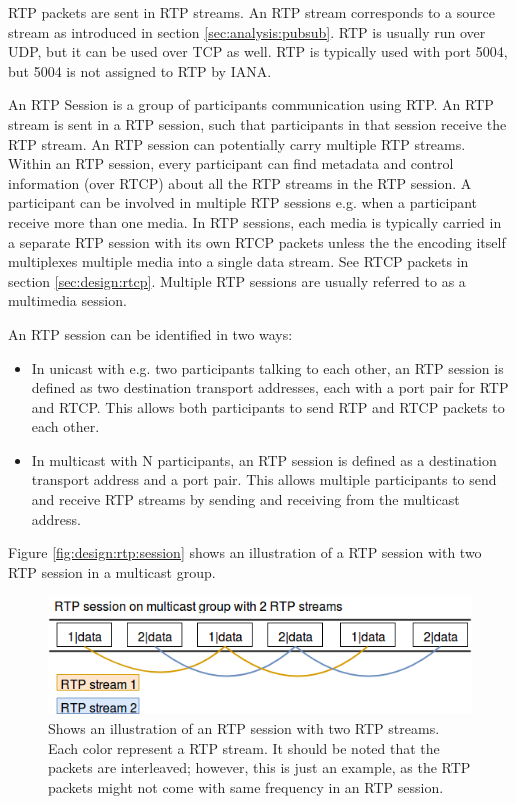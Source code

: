  \label{sec:design:rtpstream}
RTP packets are sent in RTP streams. An RTP stream corresponds to a source stream as introduced in section \ref{sec:analysis:pubsub}. RTP is usually run over UDP, but it can be used over TCP as well. RTP is typically used with port 5004, but 5004 is not assigned to RTP by IANA\citep{iana_ports}.


 \label{sec:design:rtpsession}
An RTP Session is a group of participants communication using RTP.
An RTP stream is sent in a RTP session, such that participants in that session receive the RTP stream. An RTP session can potentially carry multiple RTP streams. Within an RTP session, every participant can find metadata and control information (over RTCP) about all the RTP streams in the RTP session. A participant can be involved in multiple RTP sessions e.g. when a participant receive more than one media. In RTP sessions, each media is typically carried in a separate RTP session with its own RTCP packets unless the the encoding itself multiplexes multiple media into a single data stream. See RTCP packets in section \ref{sec:design:rtcp}. Multiple RTP sessions are usually referred to as a multimedia session.


An RTP session can be identified in two ways:
\begin{itemize}
	\item In unicast with e.g. two participants talking to each other, an RTP session is defined as two destination transport addresses, each with a port pair for RTP and RTCP. This allows both participants to send RTP and RTCP packets to each other.
	\item In multicast with N participants, an RTP session is defined as a destination transport address and a port pair. This allows multiple participants to send and receive RTP streams by sending and receiving from the multicast address.
\end{itemize}


Figure  \ref{fig:design:rtp:session} shows an illustration of a RTP session with two RTP session in a multicast group.
\begin{figure}[H]
	\centering
	\includegraphics[width=\textwidth]{figures/rtp-session}
	\caption{Shows an illustration of an RTP session with two RTP streams. Each color represent a RTP stream. It should be noted that the packets are interleaved; however, this is just an example, as the RTP packets might not come with same frequency in an RTP session.} \label{fig:desion:rtp:session}
\end{figure}

